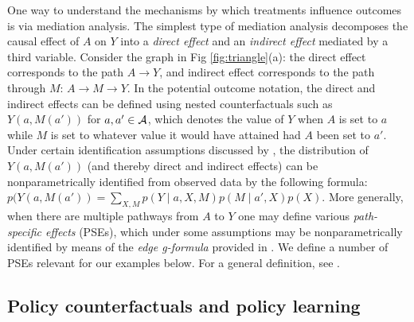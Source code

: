 \documentclass{article}
\begin{document}

One way to understand the mechanisms by which treatments influence outcomes is via mediation analysis.
The simplest type of mediation analysis
decomposes the causal effect of $A$ on $Y$ into a \textit{direct effect} and an \textit{indirect effect} mediated by a third variable. Consider the graph in Fig \ref{fig:triangle}(a): the direct effect corresponds to the path $A \rightarrow Y$, and indirect effect corresponds to the path through $M$: $A \rightarrow M \rightarrow Y$. In the potential outcome notation, the direct and indirect effects can be defined using nested counterfactuals such as $Y(a, M(a'))$ for $a, a' \in \cal A$, which denotes the value of $Y$ when $A$ is set to $a$ while $M$ is set to whatever value it would have attained had $A$ been set to $a'$. Under certain identification assumptions discussed by \citet{pearl01direct}, the distribution of $Y(a, M(a'))$ (and thereby direct and indirect effects) can be nonparametrically identified from observed data by the following formula:
$p(Y(a, M(a')) = \sum_{X, M} p(Y \mid a, X, M) p(M \mid a', X) p(X)$.
More generally, when there are multiple pathways from $A$ to $Y$ one may define various \textit{path-specific effects} (PSEs), which under some assumptions may be nonparametrically identified by means of the \textit{edge g-formula} provided in \citet{shpitser15hierarchy}.  We define a number of PSEs relevant for our examples below.  For a general definition, see \citet{shpitser13cogsci}.


\subsection*{Policy counterfactuals and policy learning}
\label{sec:policy}
\end{document}
